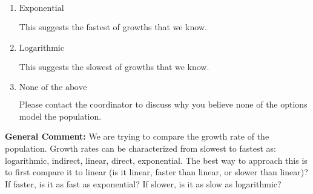\documentclass{extbook}[14pt]
\begin{document}
\begin{enumerate}
{\begin{enumerate}[label=\Alph*.]
This suggests a constant growth. You would be able to add or subtract the same amount year-to-year if this is the correct answer.
\item \( \text{Exponential} \)

This suggests the fastest of growths that we know.
\item \( \text{Logarithmic} \)

This suggests the slowest of growths that we know.
\item \( \text{None of the above} \)

Please contact the coordinator to discuss why you believe none of the options model the population.
\end{enumerate}

\textbf{General Comment:} We are trying to compare the growth rate of the population. Growth rates can be characterized from slowest to fastest as: logarithmic, indirect, linear, direct, exponential. The best way to approach this is to first compare it to linear (is it linear, faster than linear, or slower than linear)? If faster, is it as fast as exponential? If slower, is it as slow as logarithmic?
}
\end{enumerate}
\end{document}
